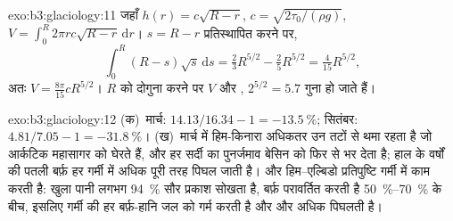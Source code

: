 \begin{solution}{exo:b3:glaciology:11}
जहाँ $h(r) = c\sqrt{R - r}$, $c = \sqrt{2\tau_0/(\rho g)}$, $V =
\int_0^R2\pi rc\sqrt{R - r}\,\mathrm dr$। $s = R - r$ प्रतिस्थापित करने पर,
\[
\int_0^R(R - s)\sqrt s\,\mathrm ds = \tfrac23R^{5/2} - \tfrac25R^{5/2} =
\tfrac4{15}R^{5/2},
\]
अतः $V = \frac{8\pi}{15}cR^{5/2}$। $R$ को दोगुना करने पर
$V$ और , $2^{5/2} = 5.7$ गुना हो जाते हैं।
\end{solution}

\begin{solution}{exo:b3:glaciology:12}
(क)~मार्च: $14.13/16.34 - 1 = \qty{-13.5}{\percent}$; सितंबर: $4.81/7.05
- 1 = \qty{-31.8}{\percent}$। (ख)~मार्च में हिम-किनारा अधिकतर उन तटों से थमा रहता है जो
आर्कटिक महासागर को घेरते हैं, और हर सर्दी का पुनर्जमाव
बेसिन को फिर से भर देता है; हाल के वर्षों की पतली बर्फ़ हर गर्मी में अधिक पूरी तरह
पिघल जाती है। और हिम--एल्बिडो प्रतिपुष्टि गर्मी में काम करती है: खुला पानी
लगभग \qty{94}{\percent} सौर प्रकाश सोखता है, बर्फ़ परावर्तित करती है
\qtyrange{50}{70}{\percent} के बीच, इसलिए गर्मी की हर बर्फ़-हानि जल को गर्म करती है और
और अधिक पिघलती है।
\end{solution}

